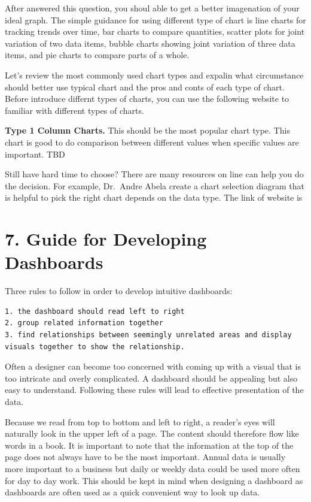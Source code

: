 \documentclass[]{book}
\theoremstyle{definition}
\theoremstyle{definition}
\theoremstyle{definition}
\theoremstyle{remark}
\begin{document}
After answered this question, you shoul able to get a better imagenation
of your ideal graph. The simple guidance for using different type of
chart is line charts for tracking trends over time, bar charts to
compare quantities, scatter plots for joint variation of two data items,
bubble charts showing joint variation of three data items, and pie
charts to compare parts of a whole.

Let's review the most commonly used chart types and expalin what
circumstance should better use typical chart and the pros and conts of
each type of chart. Before introduce differnt types of charts, you can
use the following website to familiar with different types of charts.

\textbf{Type 1 Column Charts.} This should be the most popular chart
type. This chart is good to do comparison between different values when
specific values are important. TBD

Still have hard time to choose? There are many resources on line can
help you do the decision. For example, Dr.~Andre Abela create a chart
selection diagram that is helpful to pick the right chart depends on the
data type. The link of website is

\section{7. Guide for Developing
Dashboards}\label{guide-for-developing-dashboards}

Three rules to follow in order to develop intuitive dashboards:

\begin{verbatim}
1. the dashboard should read left to right
2. group related information together
3. find relationships between seemingly unrelated areas and display visuals together to show the relationship.
\end{verbatim}

Often a designer can become too concerned with coming up with a visual
that is too intricate and overly complicated. A dashboard should be
appealing but also easy to understand. Following these rules will lead
to effective presentation of the data.

Because we read from top to bottom and left to right, a reader's eyes
will naturally look in the upper left of a page. The content should
therefore flow like words in a book. It is important to note that the
information at the top of the page does not always have to be the most
important. Annual data is usually more important to a business but daily
or weekly data could be used more often for day to day work. This should
be kept in mind when designing a dashboard as dashboards are often used
as a quick convenient way to look up data.
\end{document}
